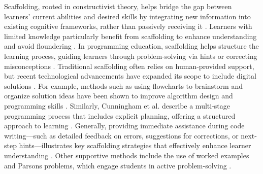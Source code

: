
Scaffolding, rooted in constructivist theory, helps bridge the gap between learners' current abilities and desired skills by integrating new information into existing cognitive frameworks, rather than passively receiving it \cite{kim2011scaffolding, pea2018social, cole1978mind, wood1976role, tobias2009constructivist}.
Learners with limited knowledge particularly benefit from scaffolding to enhance understanding and avoid floundering \cite{hmelo2007scaffolding, schmidt2007problem}. 
In programming education, scaffolding helps structure the learning process, guiding learners through problem-solving via hints or correcting misconceptions \cite{kim2011scaffolding, sykes2010design}.
Traditional scaffolding often relies on human-provided support, but recent technological advancements have expanded its scope to include digital solutions \cite{delen2014effects, kim2011scaffolding}. For example, methods such as using flowcharts to brainstorm and organize solution ideas have been shown to improve algorithm design and programming skills \cite{smetsers2017problem}. Similarly, Cunningham et al. describe a multi-stage programming process that includes explicit planning, offering a structured approach to learning \cite{cunningham2021avoiding}. 
Generally, providing immediate assistance during code writing—such as detailed feedback on errors, suggestions for corrections, or next-step hints—illustrates key scaffolding strategies that effectively enhance learner understanding \cite{singh2013automated, sykes2010design, rivers2017data}. Other supportive methods include the use of worked examples \cite{wang2022exploring} and Parsons problems, which engage students in active problem-solving \cite{hou2022using}.

